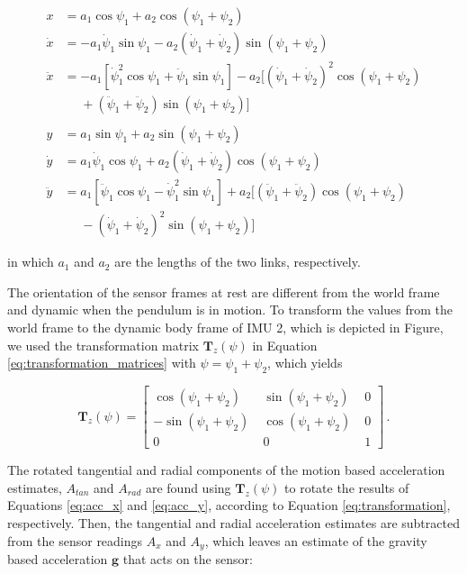 \begin{align}
  x &= a_1 \cos \psi_1 + a_2 \cos(\psi_1 + \psi_2) \\
  \dot{x} &= -a_1 \dot{\psi}_1 \sin \psi_1  - a_2 (\dot{\psi}_1 + \dot{\psi}_2) \sin(\psi_1 + \psi_2) \\
  \ddot{x} {}&= -a_1 [\dot{\psi}^2_1 \cos \psi_1 + \ddot{\psi}_1 \sin \psi_1] - a_2 [(\dot{\psi}_1 + \dot{\psi}_2)^2 \cos(\psi_1 + \psi_2) \nonumber \\ 
  &\mathrel{\phantom{=}} + (\ddot{\psi}_1 + \ddot{\psi}_2) \sin(\psi_1 + \psi_2)] \label{eq:acc_x} \\
  \nonumber \\
  y &= a_1 \sin \psi_1 + a_2 \sin(\psi_1 + \psi_2) \\
  \dot{y} &= a_1 \dot{\psi}_1 \cos \psi_1  + a_2 (\dot{\psi}_1 + \dot{\psi}_2) \cos(\psi_1 + \psi_2) \\
  \ddot{y} {}&= a_1 [\ddot{\psi}_1 \cos \psi_1 - \dot{\psi}^2_1 \sin \psi_1] + a_2 [(\ddot{\psi}_1 + \ddot{\psi}_2) \cos(\psi_1 + \psi_2) \nonumber \\ 
  &\mathrel{\phantom{=}} - (\dot{\psi}_1 + \dot{\psi}_2)^2 \sin(\psi_1 + \psi_2)] \label{eq:acc_y}
\end{align}

\noindent
in which $a_1$ and $a_2$ are the lengths of the two links, respectively.

The orientation of the sensor frames at rest are different from the world frame and dynamic when the pendulum is in motion. To transform the values from the world frame to the dynamic body frame of \gls{IMU} 2, which is depicted in Figure, we used the transformation matrix $\mathbf{T}_z(\psi)$ in Equation \ref{eq:transformation_matrices} with $\psi = \psi_1 + \psi_2$, which yields

\begin{equation}
\mathbf{T}_z(\psi) = \begin{bmatrix}
    \cos (\psi_1 + \psi_2) \; & \sin (\psi_1 + \psi_2) \; & 0 \\
    -\sin (\psi_1 + \psi_2) \; & \cos (\psi_1 + \psi_2) \; & 0 \\
    0 \; & 0 \; & 1
    \end{bmatrix}\,.
\end{equation}

The rotated tangential and radial components of the motion based acceleration estimates, $A_{tan}$ and $A_{rad}$ are found using $\mathbf{T}_z(\psi)$ to rotate the results of Equations \ref{eq:acc_x} and \ref{eq:acc_y}, according to Equation \ref{eq:transformation}, respectively. Then, the tangential and radial acceleration estimates are subtracted from the sensor readings $A_x$ and $A_y$, which leaves an estimate of the gravity based acceleration $\mathbf{g}$ that acts on the sensor:

